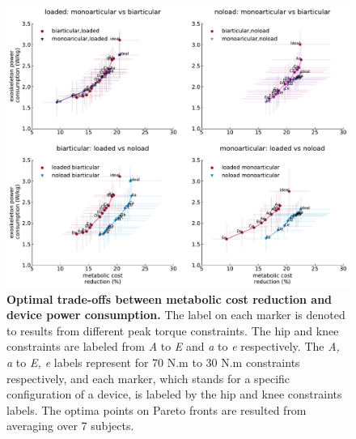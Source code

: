 \documentclass[10pt,letterpaper]{article}
\begin{document}
\begin{figure}[ht]   
	\centering
	\includegraphics[width=\linewidth]{Pareto_Simulations_Figures/PaperFigure_Main_Pareto.pdf}
	\vspace{1mm}
	\caption{{\small\textbf{Optimal trade-offs between metabolic cost reduction and device power consumption.} The label on each marker is denoted to results from different peak torque constraints. The hip and knee constraints are labeled from {\it A} to {\it E} and {\it a} to {\it e} respectively. The {\it A, a} to {\it E, e} labels represent for 70 N.m to 30 N.m constraints respectively, and each marker, which stands for a specific configuration of a device, is labeled by the hip and knee constraints labels. The optima points on Pareto fronts are resulted from averaging over 7 subjects.}}
	\label{Fig_Main_Paretofronts}
\end{figure}
\end{document}
